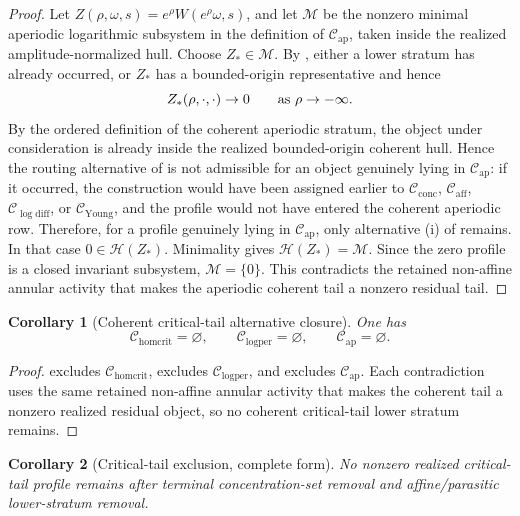 \documentclass[11pt]{amsart}
\numberwithin{equation}{section}
\theoremstyle{plain}
\newtheorem{corollary}[corollary]{Corollary}
\theoremstyle{definition}
\theoremstyle{remark}
\newcommand{\Cactive}{\mathcal C_{\mathrm{conc}}}
\newcommand{\Caff}{\mathcal C_{\mathrm{aff}}}
\newcommand{\Chomcrit}{\mathcal C_{\mathrm{homcrit}}}
\newcommand{\Clogper}{\mathcal C_{\mathrm{logper}}}
\newcommand{\Capcrit}{\mathcal C_{\mathrm{ap}}}
\newcommand{\Cyoung}{\mathcal C_{\mathrm{Young}}}
\newcommand{\Clogdiff}{\mathcal C_{\log\mathrm{diff}}}
\begin{document}
\begin{proof}
Let \(Z(\rho,\omega,s)=e^\rho W(e^\rho\omega,s)\), and let \(\mathcal M\) be
the nonzero minimal aperiodic logarithmic subsystem in the definition of
\(\Capcrit\), taken inside the realized amplitude-normalized hull.  Choose
\(Z_*\in\mathcal M\).  By ,
either a lower stratum has already occurred, or \(Z_*\) has a bounded-origin
representative and hence
\[
   Z_*(\rho,\cdot,\cdot)\to0
   \qquad\hbox{as }\rho\to-\infty .
\]
By the ordered definition of the coherent aperiodic stratum, the object under
consideration is already inside the realized bounded-origin coherent hull.
Hence the routing alternative of
 is not admissible for
an object genuinely lying in \(\Capcrit\): if it occurred, the construction
would have been assigned earlier to \(\Cactive\), \(\Caff\), \(\Clogdiff\), or
\(\Cyoung\), and the profile would not have entered the coherent aperiodic row.
Therefore, for a profile genuinely lying in \(\Capcrit\), only alternative
\textup{(i)} of  remains.  In
that case \(0\in\mathcal H(Z_*)\).
Minimality gives \(\mathcal H(Z_*)=\mathcal M\).  Since the zero profile is a
closed invariant subsystem, \(\mathcal M=\{0\}\).  This contradicts the
retained non-affine annular activity that makes the aperiodic coherent tail a
nonzero residual tail.
\end{proof}

\begin{corollary}[Coherent critical-tail alternative closure]
\label{cor:coherent-critical-tail-branch-closure}
One has
\[
   \Chomcrit=\varnothing,\qquad
   \Clogper=\varnothing,\qquad
   \Capcrit=\varnothing .
\]
\end{corollary}

\begin{proof}
 excludes
\(\Chomcrit\),  excludes
\(\Clogper\), and  excludes
\(\Capcrit\).  Each contradiction uses the same retained non-affine annular
activity that makes the coherent tail a nonzero realized residual object, so no
coherent critical-tail lower stratum remains.
\end{proof}

\begin{corollary}[Critical-tail exclusion, complete form]
\label{cor:critical-tail-exclusion-complete}
No nonzero realized critical-tail profile remains after terminal
concentration-set removal and affine/parasitic lower-stratum removal.
\end{corollary}
\end{document}

